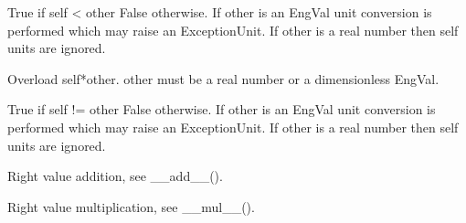 \documentclass[letterpaper,10pt,english]{sphinxmanual}
\begin{document}
\begin{fulllineitems}
\begin{fulllineitems}
\end{fulllineitems}


\begin{fulllineitems}
\label{\detokenize{ref/LIS/core/EngVal:TotalDepth.LIS.core.EngVal.EngVal.__lt__}}
True if self \textless{} other False otherwise.
If other is an EngVal unit conversion is performed which may raise an ExceptionUnit.
If other is a real number then self units are ignored.

\end{fulllineitems}


\begin{fulllineitems}
\label{\detokenize{ref/LIS/core/EngVal:TotalDepth.LIS.core.EngVal.EngVal.__mul__}}
Overload self*other. other must be a real number or a dimensionless EngVal.

\end{fulllineitems}


\begin{fulllineitems}
\label{\detokenize{ref/LIS/core/EngVal:TotalDepth.LIS.core.EngVal.EngVal.__ne__}}
True if self != other False otherwise.
If other is an EngVal unit conversion is performed which may raise an ExceptionUnit.
If other is a real number then self units are ignored.

\end{fulllineitems}


\begin{fulllineitems}
\label{\detokenize{ref/LIS/core/EngVal:TotalDepth.LIS.core.EngVal.EngVal.__radd__}}
Right value addition, see \_\_add\_\_().

\end{fulllineitems}


\begin{fulllineitems}
\label{\detokenize{ref/LIS/core/EngVal:TotalDepth.LIS.core.EngVal.EngVal.__rmul__}}
Right value multiplication, see \_\_mul\_\_().


\end{fulllineitems}
\end{fulllineitems}
\end{document}
